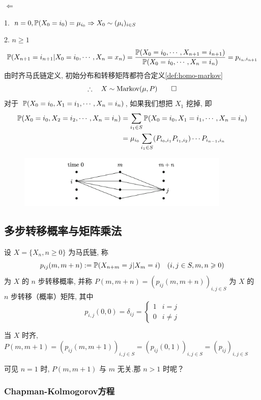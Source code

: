 $\Leftarrow$ 

1. $n=0, \mathbb{P}(X_0=i_0)=\mu_{i_0}\Rightarrow X_0\sim (\mu_i)_{i\in S}$

2. $n\geq 1$
\[
\mathbb{P}(X_{n+1}=i_{n+1}|X_0=i_0,\cdots,X_n=x_n)=\frac{\mathbb{P}(X_0=i_0,\cdots,X_{n+1}=i_{n+1})}{\mathbb{P}(X_0=i_0,\cdots, X_n=i_n)}=p_{i_n,i_{n+1}}
\]
由时齐马氏链定义, 初始分布和转移矩阵都符合定义\ref{def:homo-markov}
\[
\therefore \quad X\sim \text{Markov}(\mu,P)\qed
\]
对于 $\mathbb{P}(X_0=i_0,X_1=i_1,\cdots,X_{n}=i_{n})$, 如果我们想把 $X_1$ 挖掉, 即
\[
\begin{aligned}
    \mathbb{P}(X_0=i_0,X_2=i_2,\cdots,X_{n}=i_{n})&=\sum_{i_1\in S}\mathbb{P}(X_0=i_0,X_1=i_1,\cdots,X_{n}=i_{n})\\
    &=\mu_{i_0}\sum_{i_1\in S}(P_{i_0,i_1}P_{i_1,i_2})\cdots P_{i_{n-1},i_n}
\end{aligned}
\]

\begin{figure}[H]
    \centering
    \includegraphics[width=0.9\textwidth]{figures/split_steps.png}
\end{figure}

\newpage
\subsection{多步转移概率与矩阵乘法}

\begin{definition}
    设 $X=\{X_n,n\geq 0\}$ 为马氏链, 称
    \[
    p_{ij}(m,m+n):=\mathbb{P}(X_{n+m}=j|X_m=i)\quad (i,j\in S, m,n\geqslant 0)
    \]
    为 $X$ 的 $n$ 步转移概率, 并称 $P(m,m+n)=(p_{ij}(m,m+n))_{i,j\in S}$ 为 $X$ 的 $n$ 步转移（概率）矩阵, 其中
    \[
    p_{i,j}(0,0)=\delta_{ij}=\begin{cases}
        1 & i=j\\
        0 & i\neq j
    \end{cases}
    \]
\end{definition}

当 $X$ 时齐, $P(m,m+1)=(p_{ij}(m,m+1))_{i,j\in S}=(p_{ij}(0,1))_{i,j\in S}=(p_{ij})_{i,j\in S}$

可见 $n=1$ 时, $P(m,m+1)$ 与 $m$ 无关.那 $n>1$ 时呢？

\subsubsection{Chapman-Kolmogorov方程}

